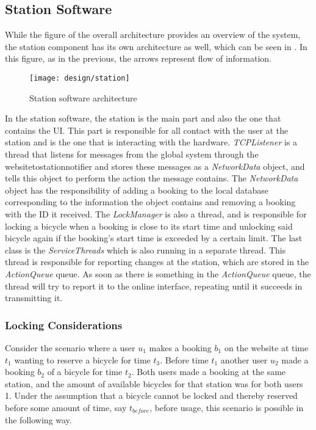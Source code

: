 \subsection{Station Software}
While the figure of the overall architecture provides an overview of the system, the station component has its own architecture as well, which can be seen in . In this figure, as in the previous, the arrows represent flow of information.

\begin{figure}[h]
	\centering
	\texttt{[image: design/station]}
	\caption{Station software architecture}\label{fig:stationarch}
\end{figure}

In the station software, the station is the main part and also the one that contains the UI. 
This part is responsible for all contact with the user at the station and is the one that is interacting with the hardware.
\textit{TCPListener} is a thread that listens for messages from the global system through the websitetostationnotifier and stores these messages as a \textit{NetworkData} object, and tells this object to perform the action the message contains.
The \textit{NetworkData} object has the responsibility of adding a booking to the local database corresponding to the information the object contains and removing a booking with the ID it received.
The \textit{LockManager} is also a thread, and is responsible for locking a bicycle when a booking is close to its start time and unlocking said bicycle again if the booking's start time is exceeded by a certain limit.
The last class is the \textit{ServiceThreads} which is also running in a separate thread.
This thread is responsible for reporting changes at the station, which are stored in the \textit{ActionQueue} queue.
As soon as there is something in the \textit{ActionQueue} queue, the thread will try to report it to the online interface, repeating until it succeeds in transmitting it.

\subsubsection{Locking Considerations}
Consider the scenario where a user $u_1$ makes a booking $b_1$ on the website at time $t_1$ wanting to reserve a bicycle for time $t_3$. Before time $t_1$ another user $u_2$ made a booking $b_2$ of a bicycle for time $t_2$. Both users made a booking at the same station, and the amount of available bicycles for that station was for both users 1. Under the assumption that a bicycle cannot be locked and thereby reserved before some amount of time, say $t_{before}$, before usage, this scenario is possible in the following way.

